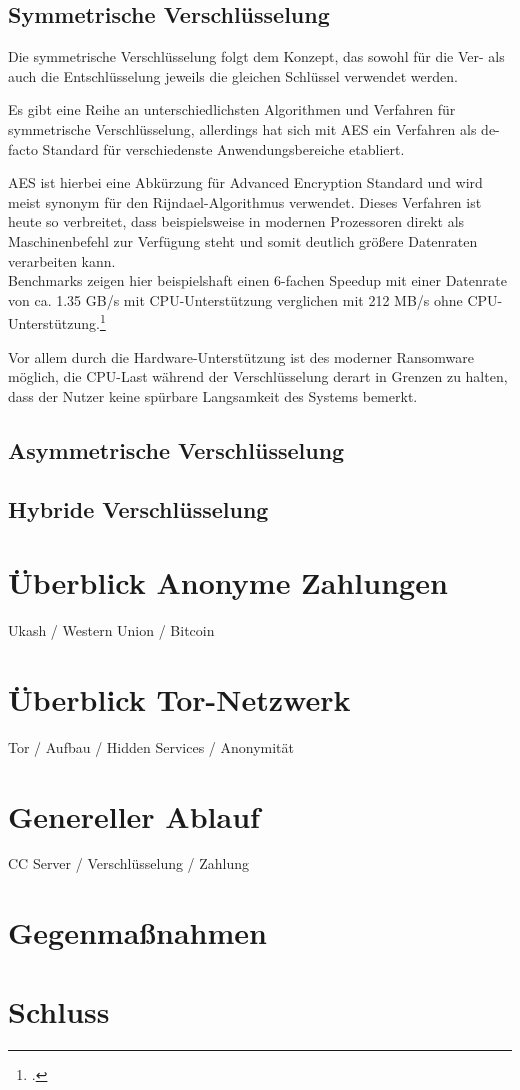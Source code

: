 \subsection{Symmetrische Verschlüsselung}
\label{sec:sym_verschl}

Die symmetrische Verschlüsselung folgt dem Konzept, das sowohl für die Ver- als auch die Entschlüsselung jeweils die gleichen Schlüssel verwendet werden.

Es gibt eine Reihe an unterschiedlichsten Algorithmen und Verfahren für symmetrische Verschlüsselung, allerdings hat sich mit \textsc{AES} ein Verfahren als de-facto Standard für verschiedenste Anwendungsbereiche etabliert.

AES ist hierbei eine Abkürzung für Advanced Encryption Standard und wird meist synonym für den Rijndael-Algorithmus verwendet. Dieses Verfahren ist heute so verbreitet, dass beispielsweise in modernen Prozessoren direkt als Maschinenbefehl zur Verfügung steht und somit deutlich größere Datenraten verarbeiten kann. \\
Benchmarks zeigen hier beispielshaft einen 6-fachen Speedup mit einer Datenrate von ca. 1.35 GB/s mit CPU-Unterstützung verglichen mit 212 MB/s ohne 
CPU-Unterstützung.\footcite{aes:benchmark}

Vor allem durch die Hardware-Unterstützung ist des moderner Ransomware möglich, die CPU-Last während der Verschlüsselung derart in Grenzen zu halten, dass der Nutzer keine spürbare Langsamkeit des Systems bemerkt. 


\subsection{Asymmetrische Verschlüsselung}
\label{sec:asym_verschl}

\subsection{Hybride Verschlüsselung}
\label{sec:hybride_verschl}




\section{Überblick Anonyme Zahlungen}
 Ukash / Western Union / Bitcoin 

\section{Überblick Tor-Netzwerk}
	Tor / Aufbau / Hidden Services / Anonymität

\section{Genereller Ablauf}
 CC Server / Verschlüsselung / Zahlung

\section{Gegenmaßnahmen}

\section{Schluss}


